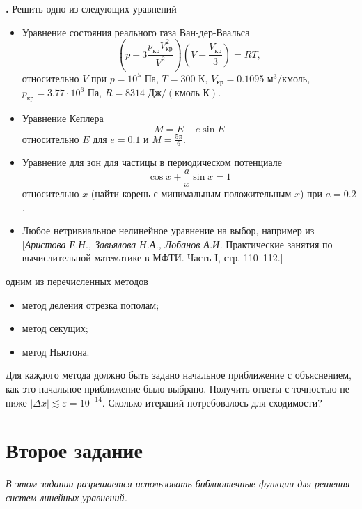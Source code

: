 \documentclass[12pt]{article}
\newcounter{task}
\newcommand{\problem}{\par\textbf{\stepcounter{task}\thetask. }}
\begin{document}
\problem Решить одно из следующих уравнений
\begin{itemize}
\item Уравнение состояния реального газа Ван-дер-Ваальса
\[
\left(p + 3\frac{p_\text{кр}V_\text{кр}^2}{V^2}\right) \left(V - \frac{V_\text{кр}}{3}\right) = RT,
\]
относительно $V$ при $p = 10^5 \text{ Па}$, $T = 300\text{ К}$, $V_\text{кр} =
0.1095 \text{ м}^3 / \text{кмоль}$,
$p_\text{кр} = 3.77\cdot 10^6 \text{ Па}$, $R = 8314 \text{ Дж} / (\text{кмоль
К})$.

\item Уравнение Кеплера
\[
M = E - e \sin E
\]
относительно $E$ для $e = 0.1$ и $M = \frac{5\pi}{6}$.

\item Уравнение для зон для частицы в периодическом потенциале
\[
\cos x + \frac{a}{x} \sin x = 1
\]
относительно $x$ (найти корень с минимальным положительным $x$) при $a = 0.2$.

\item Любое нетривиальное нелинейное уравнение на выбор, например из
[\textit{Аристова Е.Н., Завьялова Н.А., Лобанов А.И.} Практические занятия по
вычислительной математике в МФТИ. Часть I, стр. 110--112.]
\end{itemize}
одним из перечисленных методов
\begin{itemize}
\item метод деления отрезка пополам;
\item метод секущих;
\item метод Ньютона.
\end{itemize}

Для каждого метода должно быть задано начальное приближение с объяснением, как
это начальное приближение было выбрано. Получить ответы с точностью не ниже
$|\Delta x| \lesssim \varepsilon = 10^{-14}$. Сколько итераций потребовалось для
сходимости?

\section{Второе задание}

\emph{В этом задании разрешается использовать библиотечные функции для решения систем линейных уравнений.}
\medskip
\end{document}
